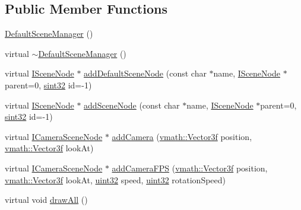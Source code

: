 \subsection*{Public Member Functions}
\begin{DoxyCompactItemize}
\item 
\hyperlink{classicee_1_1engine_1_1DefaultSceneManager_a7de7cdaa3686ba77d33a96a51ebd0de4}{DefaultSceneManager} ()
\item 
virtual \hyperlink{classicee_1_1engine_1_1DefaultSceneManager_a6ff20f4bfd365794447cf7827ae22d53}{$\sim$DefaultSceneManager} ()
\item 
virtual \hyperlink{classicee_1_1engine_1_1ISceneNode}{ISceneNode} $\ast$ \hyperlink{classicee_1_1engine_1_1DefaultSceneManager_a92412af214e790045fb5890936ac37db}{addDefaultSceneNode} (const char $\ast$name, \hyperlink{classicee_1_1engine_1_1ISceneNode}{ISceneNode} $\ast$parent=0, \hyperlink{namespacecompatibility_afc3ea6dfbdda98c9d2615b235b140a18}{sint32} id=-\/1)
\item 
virtual \hyperlink{classicee_1_1engine_1_1ISceneNode}{ISceneNode} $\ast$ \hyperlink{classicee_1_1engine_1_1DefaultSceneManager_a8e19127f7542d263d8b9b34c170f40fd}{addSceneNode} (const char $\ast$name, \hyperlink{classicee_1_1engine_1_1ISceneNode}{ISceneNode} $\ast$parent=0, \hyperlink{namespacecompatibility_afc3ea6dfbdda98c9d2615b235b140a18}{sint32} id=-\/1)
\item 
virtual \hyperlink{classicee_1_1engine_1_1ICameraSceneNode}{ICameraSceneNode} $\ast$ \hyperlink{classicee_1_1engine_1_1DefaultSceneManager_ac93bba8c1d23d86ae547020e0086c5a4}{addCamera} (\hyperlink{classvmath_1_1Vector3f}{vmath::Vector3f} position, \hyperlink{classvmath_1_1Vector3f}{vmath::Vector3f} lookAt)
\item 
virtual \hyperlink{classicee_1_1engine_1_1ICameraSceneNode}{ICameraSceneNode} $\ast$ \hyperlink{classicee_1_1engine_1_1DefaultSceneManager_a75b9d066c4ff5f231e9806cfbef64caf}{addCameraFPS} (\hyperlink{classvmath_1_1Vector3f}{vmath::Vector3f} position, \hyperlink{classvmath_1_1Vector3f}{vmath::Vector3f} lookAt, \hyperlink{namespacecompatibility_a51e8fe2956b4f39fe1fae96cec0d8393}{uint32} speed, \hyperlink{namespacecompatibility_a51e8fe2956b4f39fe1fae96cec0d8393}{uint32} rotationSpeed)
\item 
virtual void \hyperlink{classicee_1_1engine_1_1DefaultSceneManager_add821d9d71b613663c391cbc37fe5f0f}{drawAll} ()
\end{DoxyCompactItemize}



